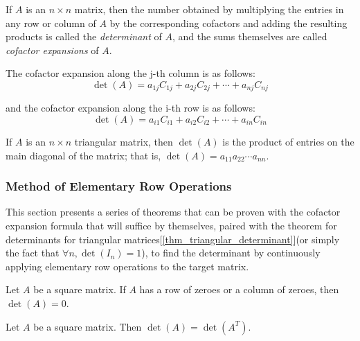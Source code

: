 \documentclass{report}
\begin{document}
				\begin{defn}[Determinant]
					If $A$ is an $n \times n$ matrix, then the number obtained by multiplying the entries in any row or column of $A$ by the corresponding cofactors and adding the resulting products is called the \emph{determinant} of $A$, and the sums themselves are called \emph{cofactor expansions} of $A$.
					
					The cofactor expansion along the j-th column is as follows:
					\begin{displaymath}
						\det(A)=a_{1j}C_{1j}+a_{2j}C_{2j}+\cdots+a_{nj}C_{nj}
					\end{displaymath}
					
					and the cofactor expansion along the i-th row is as follows:
					\begin{displaymath}
						\det(A)=a_{i1}C_{i1}+a_{i2}C_{i2}+\cdots+a_{in}C_{in}
					\end{displaymath}
				\end{defn}
				
				\begin{thm}\label{thm_triangular_determinant}
					If $A$ is an $n \times n$ triangular matrix, then $\det(A)$ is the product of entries on the main diagonal of the matrix; that is, $\det(A)=a_{11}a_{22}\cdots a_{nn}$.
				\end{thm}
			
			\subsubsection{Method of Elementary Row Operations}
				This section presents a series of theorems that can be proven with the cofactor expansion formula that will suffice by themselves, paired with the theorem for determinants for triangular matrices[\ref{thm_triangular_determinant}](or simply the fact that $\forall n, \det(I_n)=1$), to find the determinant by continuously applying elementary row operations to the target matrix.
				\begin{thm}
					Let $A$ be a square matrix. If $A$ has a row of zeroes or a column of zeroes, then $\det(A)=0$.
				\end{thm}
				
				\begin{thm}
					Let $A$ be a square matrix. Then $\det(A)=\det(A^T)$.
				\end{thm}
				
\end{document}
